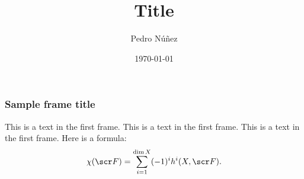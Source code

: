 \documentclass[notheorems, hyperref={backref}]{beamer}
\title[Title]{Title}
\author{Pedro Núñez}
\institute{University of Freiburg}
\date{\today}
\theoremstyle{darkgreentheorem}
\theoremstyle{darkbluedefinition}
\theoremstyle{darkredexample}
\theoremstyle{remark}
\begin{document}
 
\frame{\titlepage}
 
\begin{frame}
\frametitle{Sample frame title}
This is a text in the first frame. This is a text in the first frame. This is a text in the first frame.
Here is a formula:
\[ \chi(\F)=\sum_{i=1}^{\dim{X}}(-1)^{i}h^{i}(X,\F). \]
\end{frame}
 
\end{document}
